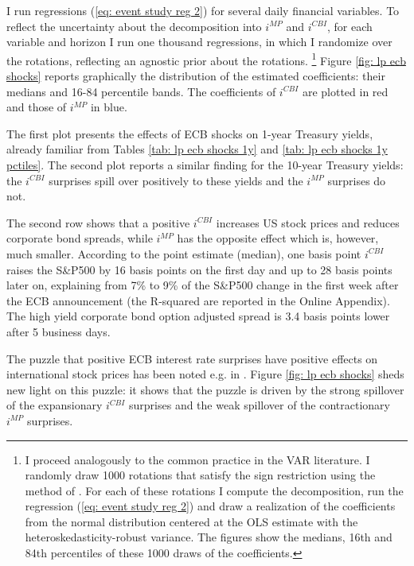 \documentclass[a4paper,12pt]{article}
\begin{document}
I run regressions (\ref{eq: event study reg 2}) for several daily financial variables.
To reflect the uncertainty about the decomposition into $i^{MP}$ and $i^{CBI}$,
for each variable and horizon I run one thousand regressions, in which I randomize over the rotations, reflecting an agnostic prior about the rotations.%
\footnote{I proceed analogously to the common practice in the VAR literature. I randomly draw 1000 rotations that satisfy the sign restriction using the method of \cite{Rubio_Waggoner_Zha_2010}. For each of these rotations I compute the decomposition, run the regression (\ref{eq: event study reg 2}) and draw a realization of the coefficients from the normal distribution centered at the OLS estimate with the heteroskedasticity-robust variance. The figures show the medians, 16th and 84th percentiles of these 1000 draws of the coefficients.}
Figure \ref{fig: lp ecb shocks} reports graphically the distribution of the estimated coefficients: their medians and 16-84 percentile bands.
The coefficients of $i^{CBI}$ are plotted in red and those of $i^{MP}$ in blue.

The first plot presents the effects of ECB shocks on 1-year Treasury yields,
already familiar from Tables \ref{tab: lp ecb shocks 1y} and \ref{tab: lp ecb shocks 1y pctiles}.
The second plot reports a similar finding for the 10-year Treasury yields: the $i^{CBI}$ surprises spill over positively to these yields and the $i^{MP}$ surprises do not.

The second row shows that a positive $i^{CBI}$ increases US stock prices and reduces corporate bond spreads,
while $i^{MP}$ has the opposite effect which is, however, much smaller.
According to the point estimate (median), one basis point $i^{CBI}$ raises the S\&P500 by 16 basis points on the first day and up to 28 basis points later on, explaining from 7\% to 9\% of  the S\&P500 change in the first week after the ECB announcement (the R-squared are reported in the Online Appendix).
The high yield corporate bond option adjusted spread is 3.4 basis points lower after 5 business days.

The puzzle that positive ECB interest rate surprises have positive effects on international stock prices 
has been noted e.g. in \cite{Brusa_etal_2020}. Figure \ref{fig: lp ecb shocks} sheds new light on this puzzle: it shows
that the puzzle is driven by the strong spillover of the expansionary $i^{CBI}$ surprises and the weak spillover of the contractionary $i^{MP}$ surprises.
\end{document}
